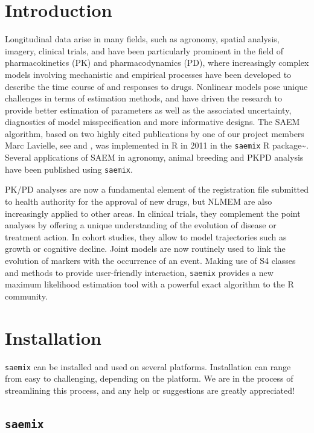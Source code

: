 \documentclass[]{book}
\begin{document}
\chapter{Introduction}\label{intro}

Longitudinal data arise in many fields, such as agronomy, spatial
analysis, imagery, clinical trials, and have been particularly prominent
in the field of pharmacokinetics (PK) and pharmacodynamics (PD), where
increasingly complex models involving mechanistic and empirical
processes have been developed to describe the time course of and
responses to drugs. Nonlinear models pose unique challenges in terms of
estimation methods, and have driven the research to provide better
estimation of parameters as well as the associated uncertainty,
diagnostics of model misspecification and more informative designs. The
SAEM algorithm, based on two highly cited publications by one of our
project members Marc Lavielle, see \citep{lavielle} and \citep{kuhn},
was implemented in R in 2011 in the \texttt{saemix} R
package\textasciitilde{}\citep{saemix2017}. Several applications of SAEM
in agronomy, animal breeding and PKPD analysis have been published using
\texttt{saemix}.

PK/PD analyses are now a fundamental element of the registration file
submitted to health authority for the approval of new drugs, but NLMEM
are also increasingly applied to other areas. In clinical trials, they
complement the point analyses by offering a unique understanding of the
evolution of disease or treatment action. In cohort studies, they allow
to model trajectories such as growth or cognitive decline. Joint models
are now routinely used to link the evolution of markers with the
occurrence of an event. Making use of S4 classes and methods to provide
user-friendly interaction, \texttt{saemix} provides a new maximum
likelihood estimation tool with a powerful exact algorithm to the R
community.

\chapter{Installation}\label{install}

\texttt{saemix} can be installed and used on several platforms.
Installation can range from easy to challenging, depending on the
platform. We are in the process of streamlining this process, and any
help or suggestions are greatly appreciated!

\section{\texorpdfstring{\texttt{saemix}}{saemix}}\label{saemix}
\end{document}
